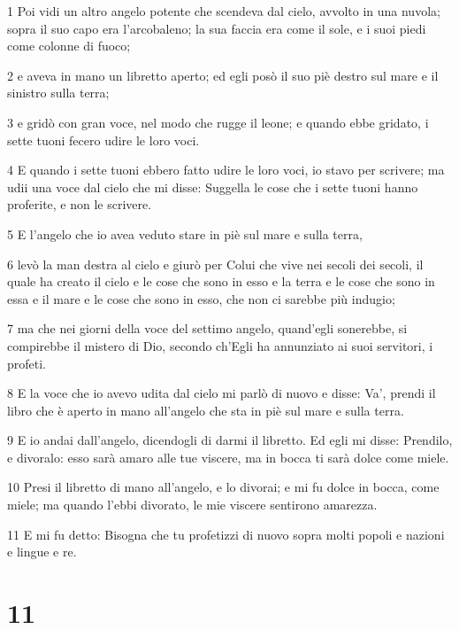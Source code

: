 \par 1 Poi vidi un altro angelo potente che scendeva dal cielo, avvolto in una nuvola; sopra il suo capo era l'arcobaleno; la sua faccia era come il sole, e i suoi piedi come colonne di fuoco;
\par 2 e aveva in mano un libretto aperto; ed egli posò il suo piè destro sul mare e il sinistro sulla terra;
\par 3 e gridò con gran voce, nel modo che rugge il leone; e quando ebbe gridato, i sette tuoni fecero udire le loro voci.
\par 4 E quando i sette tuoni ebbero fatto udire le loro voci, io stavo per scrivere; ma udii una voce dal cielo che mi disse: Suggella le cose che i sette tuoni hanno proferite, e non le scrivere.
\par 5 E l'angelo che io avea veduto stare in piè sul mare e sulla terra,
\par 6 levò la man destra al cielo e giurò per Colui che vive nei secoli dei secoli, il quale ha creato il cielo e le cose che sono in esso e la terra e le cose che sono in essa e il mare e le cose che sono in esso, che non ci sarebbe più indugio;
\par 7 ma che nei giorni della voce del settimo angelo, quand'egli sonerebbe, si compirebbe il mistero di Dio, secondo ch'Egli ha annunziato ai suoi servitori, i profeti.
\par 8 E la voce che io avevo udita dal cielo mi parlò di nuovo e disse: Va', prendi il libro che è aperto in mano all'angelo che sta in piè sul mare e sulla terra.
\par 9 E io andai dall'angelo, dicendogli di darmi il libretto. Ed egli mi disse: Prendilo, e divoralo: esso sarà amaro alle tue viscere, ma in bocca ti sarà dolce come miele.
\par 10 Presi il libretto di mano all'angelo, e lo divorai; e mi fu dolce in bocca, come miele; ma quando l'ebbi divorato, le mie viscere sentirono amarezza.
\par 11 E mi fu detto: Bisogna che tu profetizzi di nuovo sopra molti popoli e nazioni e lingue e re.

\chapter{11}

